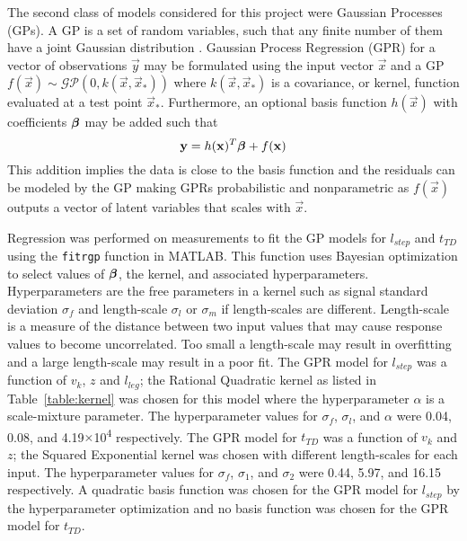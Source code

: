 The second class of models considered for this project were Gaussian Processes (GPs). A GP is a set of random variables, such that any finite number of them have a joint Gaussian distribution \cite{rasmussen2006gaussian}. Gaussian Process Regression (GPR) for a vector of observations $ \vec{y} $ may be formulated using the input vector $ \vec{x} $ and a GP $ f(\vec{x}) \sim \mathcal{GP}(0,k(\vec{x},\vec{x}_{*})) $ where $ k(\vec{x},\vec{x}_{*}) $ is a covariance, or kernel, function evaluated at a test point $ \vec{x}_{*} $. Furthermore, an optional basis function $ h(\vec{x}) $ with coefficients $ \boldsymbol{\beta} $ may be added such that
\begin{equation}
	\mathbf{y} = h(\mathbf{x})^T \boldsymbol{\beta} + f(\mathbf{x})
\end{equation}
This addition implies the data is close to the basis function and the residuals can be modeled by the GP making GPRs probabilistic and nonparametric as $ f(\vec{x}) $ outputs a vector of latent variables that scales with $ \vec{x} $.

Regression was performed on measurements to fit the GP models for $ l_{step} $ and $ t_{TD} $ using the \texttt{fitrgp} function in  MATLAB. This function uses Bayesian optimization to select values of $ \boldsymbol{\beta} $, the kernel, and associated hyperparameters. Hyperparameters are the free parameters in a kernel such as signal standard deviation $ \sigma_f $ and length-scale $ \sigma_l $ or $ \sigma_m $ if length-scales are different. Length-scale is a measure of the distance between two input values that may cause response values to become uncorrelated. Too small a length-scale may result in overfitting and a large length-scale may result in a poor fit. The GPR model for $ l_{step} $ was a function of $ v_k $, $ z $ and $ l_{leg} $; the Rational Quadratic kernel as listed in Table~\ref{table:kernel} was chosen for this model where the hyperparameter $ \alpha $ is a scale-mixture parameter. The hyperparameter values for $ \sigma_f $, $ \sigma_l $, and $ \alpha $ were 0.04, 0.08, and 4.19$ \times $10\textsuperscript{4} respectively. The GPR model for $ t_{TD} $ was a function of $ v_k $ and $ z $; the Squared Exponential kernel  was chosen with different length-scales for each input. The hyperparameter values for $ \sigma_f $, $ \sigma_1 $, and $ \sigma_2 $ were 0.44, 5.97, and 16.15 respectively. A quadratic basis function was chosen for the GPR model for $ l_{step} $ by the hyperparameter optimization and no basis function was chosen for the GPR model for $ t_{TD} $.


